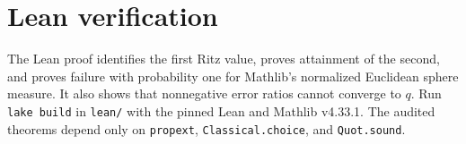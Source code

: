 \documentclass[11pt]{article}
\begin{document}
\section*{Lean verification}
The Lean proof identifies the first Ritz value, proves attainment of the
second, and proves failure with probability one for Mathlib's normalized
Euclidean sphere measure. It also shows that nonnegative error ratios
cannot converge to \(q\). Run \texttt{lake build} in \texttt{lean/} with the pinned
Lean and Mathlib v4.33.1. The audited theorems depend only on
\texttt{propext}, \texttt{Classical.choice}, and \texttt{Quot.sound}.
\end{document}
